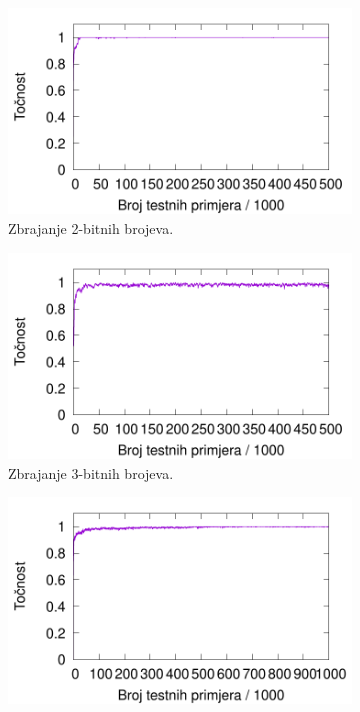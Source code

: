 \documentclass[times, utf8, zavrsni]{fer}
\begin{document}
\begin{figure}
    \centering
    \begin{subfigure}{0.496\textwidth}
        \centering
        \includegraphics[width=\textwidth]{img/carry/4care.pdf}
        \caption{Zbrajanje 2-bitnih brojeva.}
        \label{fig:4care}
    \end{subfigure}
    \begin{subfigure}{0.496\textwidth}
        \centering
        \includegraphics[width=\textwidth]{img/carry/6care.pdf}
        \caption{Zbrajanje 3-bitnih brojeva.}
        \label{fig:6care}
    \end{subfigure}
    \begin{subfigure}{0.496\textwidth}
        \centering
        \includegraphics[width=\textwidth]{img/carry/8care.pdf}

\end{subfigure}
\end{figure}
\end{document}
